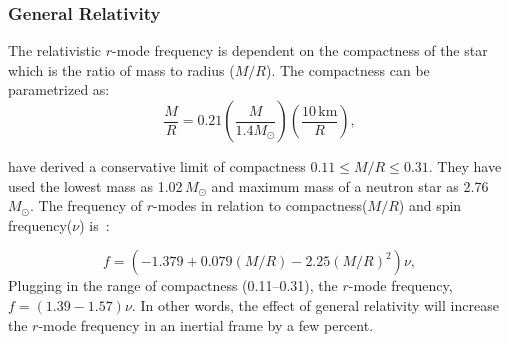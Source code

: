 \documentclass{ttuthes2007}
\begin{document}
\subsubsection{General Relativity}
The relativistic $r$-mode frequency is dependent on the compactness of the star which is the ratio of mass to radius ($M/R$). The compactness can be parametrized as:
\begin{equation}
\frac{M}{R}=0.21\left(\frac{M}{1.4M_\odot}\right)\left(\frac{10\,\mathrm{km}}{R}\right),
\end{equation} 

\citet{Idrisy_2015} have derived a conservative limit of compactness $0.11 \leq
M/R \leq 0.31$. They have used the lowest mass as 1.02\,$M_\odot$ and maximum
mass of a neutron star as 2.76\,$M_\odot$. The frequency of $r$-modes in relation to
compactness($M/R$) and spin frequency($\nu$) is~\cite{Idrisy_2015}: 

\begin{equation}
f=(-1.379 + 0.079(M/R) - 2.25(M/R)^2)\nu,
\end{equation}  
Plugging in the range of compactness (0.11--0.31), the $r$-mode frequency,
$f=(1.39-1.57)\nu$.
In other words, the effect of general relativity will increase the $r$-mode frequency in an inertial frame by a few percent.
\end{document}
